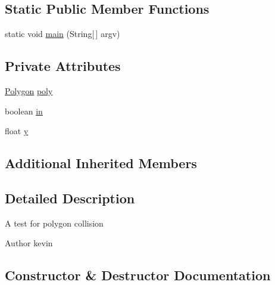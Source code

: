 \subsection*{Static Public Member Functions}
\begin{DoxyCompactItemize}
\item 
static void \mbox{\hyperlink{classorg_1_1newdawn_1_1slick_1_1tests_1_1_polygon_test_a3d5a51be6c2602b4ee1e09024c7d90b5}{main}} (String\mbox{[}$\,$\mbox{]} argv)
\end{DoxyCompactItemize}
\subsection*{Private Attributes}
\begin{DoxyCompactItemize}
\item 
\mbox{\hyperlink{classorg_1_1newdawn_1_1slick_1_1geom_1_1_polygon}{Polygon}} \mbox{\hyperlink{classorg_1_1newdawn_1_1slick_1_1tests_1_1_polygon_test_a9208c4dd8be9ef4468e17c2d6f0fdff0}{poly}}
\item 
boolean \mbox{\hyperlink{classorg_1_1newdawn_1_1slick_1_1tests_1_1_polygon_test_ab090a6129c72d1e91c59185d568fb381}{in}}
\item 
float \mbox{\hyperlink{classorg_1_1newdawn_1_1slick_1_1tests_1_1_polygon_test_a813c5c92c8a815884c5a52fa83451401}{y}}
\end{DoxyCompactItemize}
\subsection*{Additional Inherited Members}


\subsection{Detailed Description}
A test for polygon collision

\begin{DoxyAuthor}{Author}
kevin 
\end{DoxyAuthor}


\subsection{Constructor \& Destructor Documentation}
\mbox{\label{classorg_1_1newdawn_1_1slick_1_1tests_1_1_polygon_test_ac067fe625dbe2ba4c96e8cb7d94252ca}} 
